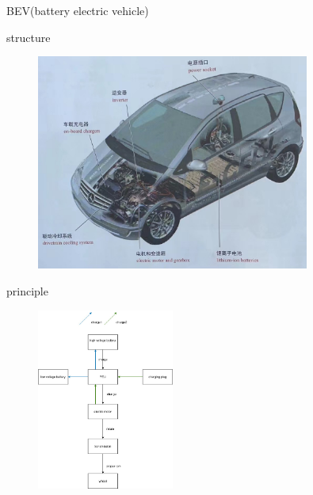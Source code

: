 \begin{frame}
	\begin{block}{BEV(battery electric vehicle)}
		\begin{compactitem}
			\item structure
				\begin{figure}[htbp]
					\centering
					\includegraphics[width=0.8\textwidth]{1-21}
				\end{figure}
		\end{compactitem}
	\end{block}
\end{frame}
\begin{frame}
	\begin{block}{}
		\begin{compactitem}
			\item principle
			\begin{figure}[htbp]
				\centering
				\includegraphics[width=0.4\textwidth]{1-22}
			\end{figure}
		\end{compactitem}
	\end{block}
\end{frame}
